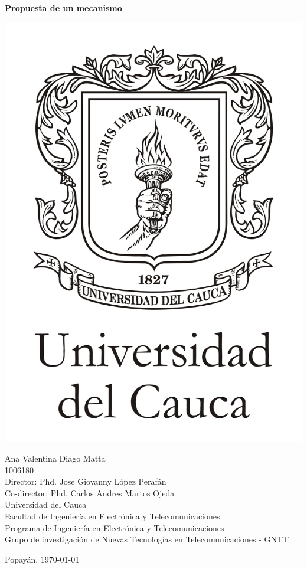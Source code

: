 \thispagestyle{empty}

\begin{center}

    \textbf{\large Propuesta de un mecanismo 
    }\\
    \vfill

    
    \includegraphics[scale=0.45]{img/logo-unicauca-n.jpg} \\
    \vfill
    
    
    Ana Valentina Diago Matta\\
    1006180 \\
    
    \vfill
    Director: Phd. Jose Giovanny López Perafán \\
    Co-director: Phd. Carlos Andres Martos Ojeda \\
    

    \vfill
    Universidad del Cauca\\
    Facultad de Ingeniería en Electrónica y Telecomunicaciones\\
    Programa de Ingeniería en Electrónica y Telecomunicaciones\\
    Grupo de investigación de Nuevas Tecnologías en Telecomunicaciones - GNTT\\
    \date{\today}
    Popayán, \today
\end{center} 
